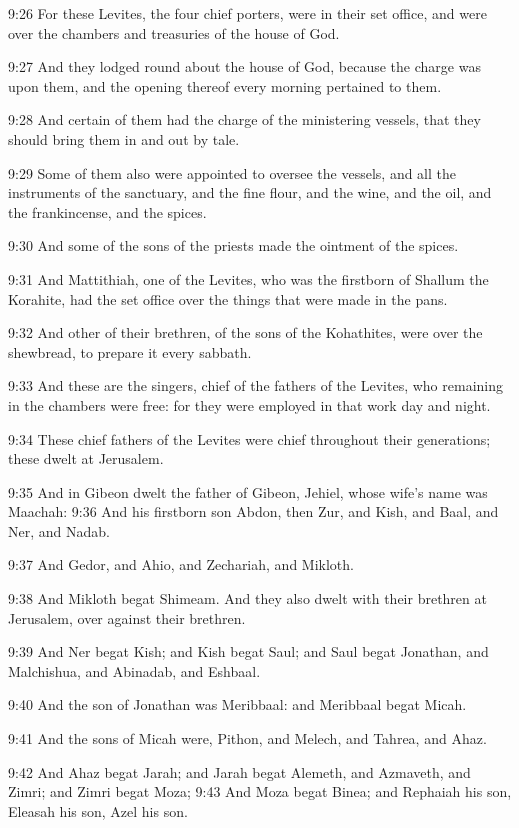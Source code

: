 9:26 For these Levites, the four chief porters, were in their set
office, and were over the chambers and treasuries of the house of God.

9:27 And they lodged round about the house of God, because the charge
was upon them, and the opening thereof every morning pertained to
them.

9:28 And certain of them had the charge of the ministering vessels,
that they should bring them in and out by tale.

9:29 Some of them also were appointed to oversee the vessels, and all
the instruments of the sanctuary, and the fine flour, and the wine,
and the oil, and the frankincense, and the spices.

9:30 And some of the sons of the priests made the ointment of the
spices.

9:31 And Mattithiah, one of the Levites, who was the firstborn of
Shallum the Korahite, had the set office over the things that were
made in the pans.

9:32 And other of their brethren, of the sons of the Kohathites, were
over the shewbread, to prepare it every sabbath.

9:33 And these are the singers, chief of the fathers of the Levites,
who remaining in the chambers were free: for they were employed in
that work day and night.

9:34 These chief fathers of the Levites were chief throughout their
generations; these dwelt at Jerusalem.

9:35 And in Gibeon dwelt the father of Gibeon, Jehiel, whose wife's
name was Maachah: 9:36 And his firstborn son Abdon, then Zur, and
Kish, and Baal, and Ner, and Nadab.

9:37 And Gedor, and Ahio, and Zechariah, and Mikloth.

9:38 And Mikloth begat Shimeam. And they also dwelt with their
brethren at Jerusalem, over against their brethren.

9:39 And Ner begat Kish; and Kish begat Saul; and Saul begat Jonathan,
and Malchishua, and Abinadab, and Eshbaal.

9:40 And the son of Jonathan was Meribbaal: and Meribbaal begat Micah.

9:41 And the sons of Micah were, Pithon, and Melech, and Tahrea, and
Ahaz.

9:42 And Ahaz begat Jarah; and Jarah begat Alemeth, and Azmaveth, and
Zimri; and Zimri begat Moza; 9:43 And Moza begat Binea; and Rephaiah
his son, Eleasah his son, Azel his son.

